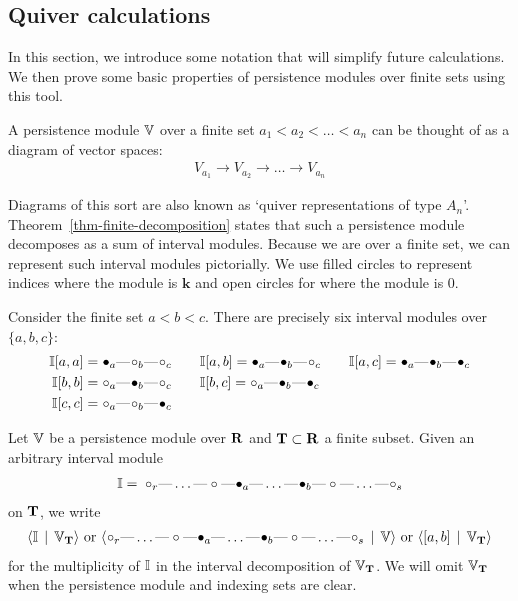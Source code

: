 \subsection{Quiver calculations}

In this section, we introduce some notation that will simplify future calculations. We then prove some basic properties of persistence modules over finite sets using this tool. 

A persistence module $\mathbb{V}$ over a finite set $a_1 < a_2 < \dots < a_n$ can be thought of as a diagram of vector spaces:
\begin{align*}
V_{a_1} \to V_{a_2} \to \dots \to V_{a_n}
\end{align*}

Diagrams of this sort are also known as `quiver representations of type $A_n$'. Theorem~\ref{thm-finite-decomposition} states that such a persistence module decomposes as a sum of interval modules. Because we are over a finite set, we can represent such interval modules pictorially. We use filled circles to represent indices where the module is $\mathbf{k}$ and open circles for where the module is 0.

Consider the finite set $a < b < c$. There are precisely six interval modules over $\{a, b, c\}$:
\begin{align*}
\I[a, a] &= \qon{a} \qem \qoff{b} \qem \qoff{c} \qquad \I[a, b] = \qon{a} \qem \qon{b} \qem \qoff{c} \qquad \I[a, c] = \qon{a} \qem \qon{b} \qem \qon{c}\\
\I[b, b] &= \qoff{a} \qem \qon{b} \qem \qoff{c} \qquad \I[b, c] = \qoff{a} \qem \qon{b} \qem \qon{c} \\
\I[c, c] &= \qoff{a} \qem \qoff{b} \qem \qon{c} 
\end{align*}

\begin{definition}
Let $\mathbb{V}$ be a persistence module over $\mathbf{R}$ and $\mathbf{T} \subset \mathbf{R}$ a finite subset. Given an arbitrary interval module 
\begin{align*}
\I = \: \qoff{r} \qem \dots \qem \qoff{} \qem \qon{a} \qem \dots \qem \qon{b} \qem \qoff{} \qem \dots \qem \qoff{s}
\end{align*}
on $\mathbf{T}$, we write
\begin{align*}
\langle \I \st \V_\T \rangle \text{ or } \langle \qoff{r} \qem \dots \qem \qoff{} \qem \qon{a} \qem \dots \qem \qon{b} \qem \qoff{} \qem \dots \qem \qoff{s} \st \V \rangle \text{ or } \langle [a, b] \st \V_\T \rangle
\end{align*}
for the multiplicity of $\mathbb{I}$ in the interval decomposition of $\mathbb{V}_{\mathbf{T}}$. We will omit $\mathbb{V}_{\mathbf{T}}$ when the persistence module and indexing sets are clear.
\end{definition}

